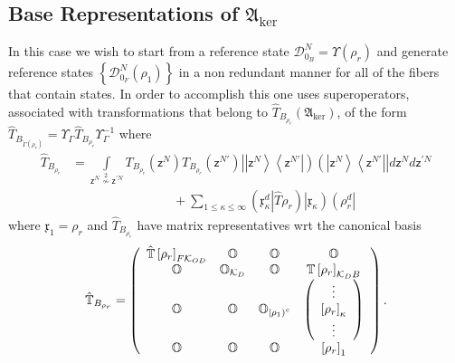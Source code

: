 \documentclass[aps,preprint]{revtex4}%
\begin{document}
\subsection{Base Representations of $\mathfrak{A}_{\ker}\label{baserep}$}

In this case we wish to start from a reference state $\mathcal{D}_{0_{B}}%
^{N}=\Upsilon\left(  \mathfrak{\rho}_{r}\right)  $ and generate reference
states $\left\{  \mathcal{D}_{0_{F}}^{N}\left(  \rho_{1}\right)  \right\}  $
in a non redundant manner for all of the fibers that contain states. In order
to accomplish this one uses superoperators, associated with transformations
that belong to $\hat{T}_{B_{\mathfrak{\rho}_{r}}}\left(  \mathfrak{A}_{\ker
}\right)  $, of the form $\hat{T}_{B_{\tilde{\Gamma}\left(  \mathfrak{\rho
}_{r}\right)  }}=\Upsilon_{\Gamma}\hat{T}_{B_{\mathfrak{\rho}_{r}}}%
\Upsilon_{\Gamma}^{-1}$ where
\begin{align}
\hat{T}_{B_{\mathfrak{\rho}_{r}}}  &  =%
{\displaystyle\int\limits_{\mathsf{z}^{N}\overset{2}{\nsim}\mathsf{z}^{\prime
N}}}
T_{B_{\mathfrak{\rho}_{r}}}\left(  \mathsf{z}^{N}\right)  T_{B_{\mathfrak{\rho
}_{r}}}\left(  \mathsf{z}^{N\prime}\right)  \left\vert \left\vert
\mathsf{z}^{N}\right\rangle \left\langle \mathsf{z}^{N\prime}\right\vert
\right)  \left(  \left\vert \mathsf{z}^{N}\right\rangle \left\langle
\mathsf{z}^{N\prime}\right\vert \right\vert d\mathsf{z}^{N}d\mathsf{z}^{\prime
N}\nonumber\\
&  \qquad\qquad\qquad\qquad+%
{\displaystyle\sum\limits_{1\leq\kappa\leq\infty}}
\left(  \mathfrak{x}_{\kappa}^{d}\left\vert \hat{T}\right.  \mathfrak{\rho
}_{r}\right)  \left\vert \mathfrak{x}_{\kappa}\right)  \left(  \mathfrak{\rho
}_{r}^{d}\right\vert
\end{align}
where $\mathfrak{x}_{1}=\mathfrak{\rho}_{r}$ and $\hat{T}_{B_{\mathfrak{\rho
}_{r}}}$ have matrix representatives wrt the canonical basis
\begin{equation}
\mathbb{\hat{T}}_{B_{\mathfrak{\rho}_{r}}}=\left(
\begin{array}
[c]{cccc}%
\mathbb{\hat{T}}\left[  \mathfrak{\rho}_{r}\right]  _{F\mathcal{K}_{OD}} &
\mathbb{O} & \mathbb{O} & \mathbb{O}\\
\mathbb{O} & \mathbb{O}_{\mathcal{K}_{D}} & \mathbb{O} & \mathbb{T}\left[
\mathfrak{\rho}_{r}\right]  _{\mathcal{K}_{D}B}\\
\mathbb{O} & \mathbb{O} & \mathbb{O}_{\left\vert \mathfrak{\rho}_{1}\right)
^{c}} & \left(
\begin{array}
[c]{c}%
\vdots\\
\left[  \mathfrak{\rho}_{r}\right]  _{\kappa}\\
\vdots
\end{array}
\right) \\
\mathbb{O} & \mathbb{O} & \mathbb{O} & \left[  \mathfrak{\rho}_{r}\right]
_{1}%
\end{array}
\right)  .
\end{equation}
\end{document}
